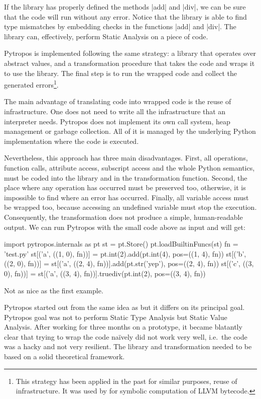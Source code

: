 If the library has properly defined the methods \pycode|add| and
\pycode|div|, we can be sure that the code will run without any error.
Notice that the library is able to find type mismatches by embedding
checks in the functions \pycode|add| and \pycode|div|. The library can,
effectively, perform Static Analysis on a piece of code.

Pytropos is implemented following the same strategy: a library that
operates over abstract values, and a transformation procedure that takes
the code and wraps it to use the library. The final step is to run the
wrapped code and collect the generated errors\footnote{This strategy has
  been applied in the past for similar purposes, reuse of
  infrastructure. It was used by \textcite{lauko_symbolic_2018} for
  symbolic computation of LLVM bytecode.
  }.

The main advantage of translating code into wrapped code is the reuse of
infrastructure. One does not need to write all the infrastructure that
an interpreter needs. Pytropos does not implement its own call system,
heap management or garbage collection. All of it is managed by the
underlying Python implementation where the code is executed.

Nevertheless, this approach has three main disadvantages. First, all
operations, function calls, attribute access, subscript access and the
whole Python semantics, must be coded into the library and in the
transformation function. Second, the place where any operation has
occurred must be preserved too, otherwise, it is impossible to find where
an error has occurred. Finally, all variable access must be wrapped too,
because accessing an undefined variable must stop the execution.
Consequently, the transformation does not produce a simple,
human-readable output. We can run Pytropos with the small code above as
input and will get:

\begin{pythoncode}
import pytropos.internals as pt
st = pt.Store()
pt.loadBuiltinFuncs(st)
fn = 'test.py'
st[('a', ((1, 0), fn))] = pt.int(2).add(pt.int(4), pos=((1, 4), fn))
st[('b', ((2, 0), fn))] = st[('a', ((2, 4), fn))].add(pt.str('yep'), pos=((2, 4), fn))
st[('c', ((3, 0), fn))] = st[('a', ((3, 4), fn))].truediv(pt.int(2), pos=((3, 4), fn))
\end{pythoncode}

Not as nice as the first example.

Pytropos started out from the same idea as \textcite{ortin_towards_2015}
but it differs on its principal goal. Pytropos goal was not to perform
Static Type Analysis but Static Value Analysis. After working for three
months on a prototype, it became blatantly clear that trying to wrap the
code naïvely did not work very well, i.e.~the code was a hacky and not
very resilient. The library and transformation needed to be based on a
solid theoretical framework.


